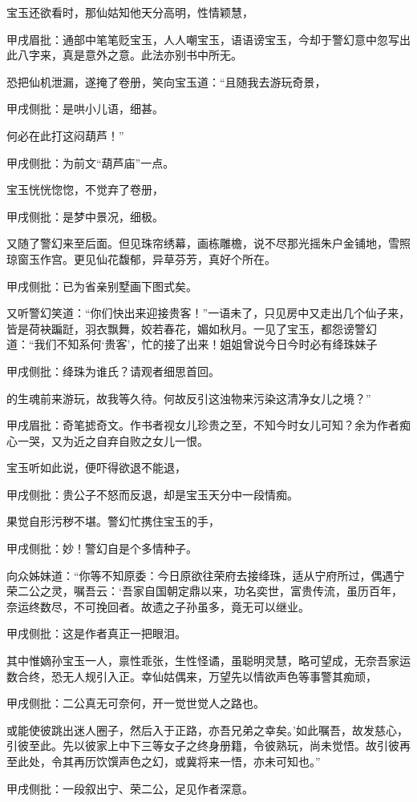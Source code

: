 \begin{parag}

    宝玉还欲看时，那仙姑知他天分高明，性情颖慧，\begin{note}甲戌眉批：通部中笔笔贬宝玉，人人嘲宝玉，语语谤宝玉，今却于警幻意中忽写出此八字来，真是意外之意。此法亦别书中所无。\end{note}恐把仙机泄漏，遂掩了卷册，笑向宝玉道：“且随我去游玩奇景，\begin{note}甲戌侧批：是哄小儿语，细甚。\end{note}何必在此打这闷葫芦！”\begin{note}甲戌侧批：为前文“葫芦庙”一点。\end{note}
\end{parag}


\begin{parag}


    宝玉恍恍惚惚，不觉弃了卷册，\begin{note}甲戌侧批：是梦中景况，细极。\end{note}又随了警幻来至后面。但见珠帘绣幕，画栋雕檐，说不尽那光摇朱户金铺地，雪照琼窗玉作宫。更见仙花馥郁，异草芬芳，真好个所在。\begin{note}甲戌侧批：已为省亲别墅画下图式矣。\end{note}又听警幻笑道：“你们快出来迎接贵客！”一语未了，只见房中又走出几个仙子来，皆是荷袂蹁跹，羽衣飘舞，姣若春花，媚如秋月。一见了宝玉，都怨谤警幻道：“我们不知系何‘贵客’，忙的接了出来！姐姐曾说今日今时必有绛珠妹子\begin{note}甲戌侧批：绛珠为谁氏？请观者细思首回。\end{note}的生魂前来游玩，故我等久待。何故反引这浊物来污染这清净女儿之境？”\begin{note}甲戌眉批：奇笔摅奇文。作书者视女儿珍贵之至，不知今时女儿可知？余为作者痴心一哭，又为近之自弃自败之女儿一恨。\end{note}宝玉听如此说，便吓得欲退不能退，\begin{note}甲戌侧批：贵公子不怒而反退，却是宝玉天分中一段情痴。\end{note}果觉自形污秽不堪。警幻忙携住宝玉的手，\begin{note}甲戌侧批：妙！警幻自是个多情种子。\end{note}向众姊妹道：“你等不知原委：今日原欲往荣府去接绛珠，适从宁府所过，偶遇宁荣二公之灵，嘱吾云：‘吾家自国朝定鼎以来，功名奕世，富贵传流，虽历百年，奈运终数尽，不可挽回者。故遗之子孙虽多，竟无可以继业。\begin{note}甲戌侧批：这是作者真正一把眼泪。\end{note}其中惟嫡孙宝玉一人，禀性乖张，生性怪谲，虽聪明灵慧，略可望成，无奈吾家运数合终，恐无人规引入正。幸仙姑偶来，万望先以情欲声色等事警其痴顽，\begin{note}甲戌侧批：二公真无可奈何，开一觉世觉人之路也。\end{note}或能使彼跳出迷人圈子，然后入于正路，亦吾兄弟之幸矣。’如此嘱吾，故发慈心，引彼至此。先以彼家上中下三等女子之终身册籍，令彼熟玩，尚未觉悟。故引彼再至此处，令其再历饮馔声色之幻，或冀将来一悟，亦未可知也。”\begin{note}甲戌侧批：一段叙出宁、荣二公，足见作者深意。\end{note}
\end{parag}


